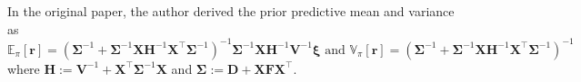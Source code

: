 \documentclass[11pt]{article}
\theoremstyle{plain} %
\newenvironment{topic}
  {\color{C2}\normalfont\begin{framed}\begingroup}
    {\endgroup\end{framed}}
\theoremstyle{remark}
\newenvironment{remark}
  {\pushQED{\qed}\renewcommand{\qedsymbol}{$\triangle$}\remarkx}
  {\popQED\endremarkx}
\begin{document}
\begin{topic}
  \begin{remark}
    In the original paper, the author derived the prior predictive mean and variance as
    $$
      \mathbb{E}_\pi[\boldsymbol{r}]
      =\left(\boldsymbol{\Sigma}^{-1}+\boldsymbol{\Sigma}^{-1} \boldsymbol{X} \boldsymbol{H}^{-1} \boldsymbol{X}^\top \boldsymbol{\Sigma}^{-1}\right)^{-1} \boldsymbol{\Sigma}^{-1} \boldsymbol{X} \boldsymbol{H}^{-1} \boldsymbol{V}^{-1} \boldsymbol{\xi}
      \text{ and }
      \mathbb{V}_\pi[\boldsymbol{r}]=\left(\boldsymbol{\Sigma}^{-1}+\boldsymbol{\Sigma}^{-1} \boldsymbol{X} \boldsymbol{H}^{-1} \boldsymbol{X}^\top \boldsymbol{\Sigma}^{-1}\right)^{-1}
    $$
    where $\boldsymbol{H}:=\boldsymbol{V}^{-1}+\boldsymbol{X}^\top \boldsymbol{\Sigma}^{-1} \boldsymbol{X}$ and $\boldsymbol{\Sigma}:=\boldsymbol{D}+\boldsymbol{X F} \boldsymbol{X}^\top$.


\end{remark}
\end{topic}
\end{document}
